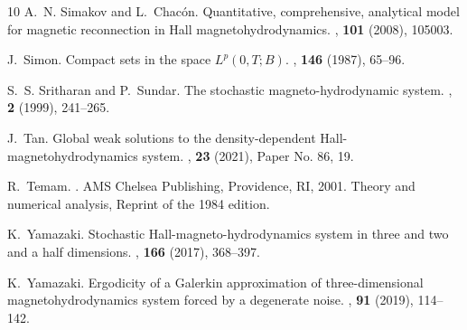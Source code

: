 \documentclass[11pt, reqno]{amsart}
\theoremstyle{definition}
\numberwithin{equation}{section}
\begin{document}
\begin{thebibliography}{10}
	A.~N. Simakov and L.~Chac\'on.
	\newblock Quantitative, comprehensive, analytical model for magnetic
	reconnection in {H}all magnetohydrodynamics.
	,  {\bf 101} (2008), 105003.
	
	J.~Simon.
	\newblock Compact sets in the space {$L^p(0,T;B)$}.
	,  {\bf 146} (1987), 65--96.
	
	S.~S. Sritharan and P.~Sundar.
	\newblock The stochastic magneto-hydrodynamic system.
	,  {\bf 2}
	(1999), 241--265.
	
	J.~Tan.
	\newblock Global weak solutions to the density-dependent
	{H}all-magnetohydrodynamics system.
	,  {\bf 23} (2021), Paper No. 86, 19.
	
	R.~Temam.
	.
	\newblock AMS Chelsea Publishing, Providence, RI, 2001.
	\newblock Theory and numerical analysis, Reprint of the 1984 edition.
	
	K.~Yamazaki.
	\newblock Stochastic {H}all-magneto-hydrodynamics system in three and two and a
	half dimensions.
	,  {\bf 166} (2017), 368--397.
	
	K.~Yamazaki.
	\newblock Ergodicity of a {G}alerkin approximation of three-dimensional
	magnetohydrodynamics system forced by a degenerate noise.
	,  {\bf 91} (2019), 114--142.
	
\end{thebibliography}
\end{document}
